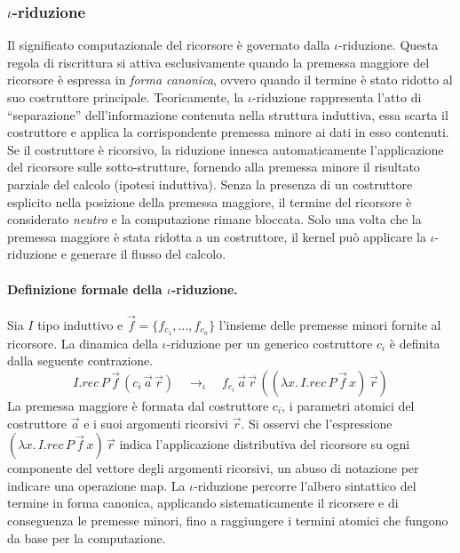 \subsubsection{\texorpdfstring{$\iota$}{iota}-riduzione}
Il significato computazionale del ricorsore è governato dalla $\iota$-riduzione. Questa regola di riscrittura si attiva esclusivamente quando la premessa maggiore del 
ricorsore è espressa in \emph{forma canonica}, ovvero quando il termine è stato ridotto al suo costruttore principale. Teoricamente, la $\iota$-riduzione rappresenta 
l'atto di ``separazione'' dell'informazione contenuta nella struttura induttiva, essa scarta il costruttore e applica la corrispondente premessa minore ai dati in esso 
contenuti. Se il costruttore è ricorsivo, la riduzione innesca automaticamente l'applicazione del ricorsore sulle sotto-strutture, fornendo alla premessa minore il 
risultato parziale del calcolo (ipotesi induttiva). Senza la presenza di un costruttore esplicito nella posizione della premessa maggiore, il termine del ricorsore è 
considerato \emph{neutro} e la computazione rimane bloccata. Solo una volta che la premessa maggiore è stata ridotta a un costruttore, il kernel può applicare la 
$\iota$-riduzione e generare il flusso del calcolo.

\paragraph{Definizione formale della $\iota$-riduzione.}
Sia $I$ tipo induttivo e $\vec{f} = \{f_{c_1}, \dots, f_{c_n}\}$ l'insieme delle premesse minori fornite al ricorsore. La dinamica della $\iota$-riduzione 
per un generico costruttore $c_i$ è definita dalla seguente contrazione.
\begin{equation}
    I.rec \, P \, \vec{f} \, (c_i \, \vec{a} \, \vec{r}) \quad 
    \to_\iota 
    \quad f_{c_i} \, \vec{a} \, \vec{r} \, ((\lambda x. \, I.rec \, P \, \vec{f} \, x) \, \vec{r})
\end{equation}
La premessa maggiore è formata dal costruttore $c_i$, i parametri atomici del costruttore $\vec{a}$ e i suoi argomenti ricorsivi $\vec{r}$. Si osservi che l'espressione 
$(\lambda x. \, I.rec \, P \, \vec{f} \, x) \, \vec{r}$ indica l'applicazione distributiva del ricorsore su ogni componente del vettore degli argomenti ricorsivi, un abuso 
di notazione per indicare una operazione map. La $\iota$-riduzione percorre l'albero sintattico del termine in forma canonica, applicando sistematicamente il ricorsere e di
conseguenza le premesse minori, fino a raggiungere i termini atomici che fungono da base per la computazione.

